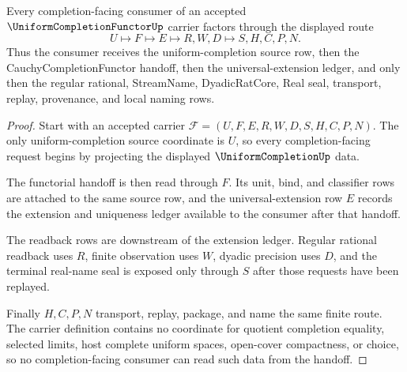 \begin{theorem}
\label{thm:uniform-completion-functor-universal-handoff}
Every completion-facing consumer of an accepted $\UniformCompletionFunctorUp$ carrier factors through the displayed route
$$
U \longmapsto F \longmapsto E \longmapsto R,W,D \longmapsto S,H,C,P,N .
$$
Thus the consumer receives the uniform-completion source row, then the CauchyCompletionFunctor handoff, then the universal-extension ledger, and only then the regular rational, StreamName, DyadicRatCore, Real seal, transport, replay, provenance, and local naming rows.
\end{theorem}
\begin{proof}
Start with an accepted carrier $\mathcal{F}=(U,F,E,R,W,D,S,H,C,P,N)$. The only uniform-completion source coordinate is $U$, so every completion-facing request begins by projecting the displayed $\UniformCompletionUp$ data.

The functorial handoff is then read through $F$. Its unit, bind, and classifier rows are attached to the same source row, and the universal-extension row $E$ records the extension and uniqueness ledger available to the consumer after that handoff.

The readback rows are downstream of the extension ledger. Regular rational readback uses $R$, finite observation uses $W$, dyadic precision uses $D$, and the terminal real-name seal is exposed only through $S$ after those requests have been replayed.

Finally $H,C,P,N$ transport, replay, package, and name the same finite route. The carrier definition contains no coordinate for quotient completion equality, selected limits, host complete uniform spaces, open-cover compactness, or choice, so no completion-facing consumer can read such data from the handoff.
\end{proof}

